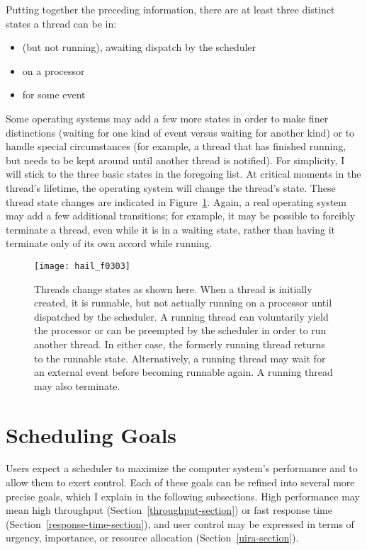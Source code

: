 Putting together the preceding information, there are at least
three distinct states a thread can be in:
\begin{itemize}
\item {} (but not running), awaiting dispatch by the scheduler
\item {} on a processor
\item {} for some event
\end{itemize}
Some operating systems may add a few more states in order to make
finer distinctions (waiting for one kind of event versus waiting for
another kind) or to handle special circumstances (for example, a thread that
has finished running, but needs to be kept around until another thread
is notified).  For simplicity, I will stick to the three basic states
in the foregoing list.  At critical moments in the thread's lifetime, the
operating system will change the thread's state.  These thread state
changes are indicated in Figure~\ref{state-diagram}. Again, a real
operating system may add a few additional transitions; for example, it
may be possible to forcibly terminate a thread, even while it is in a
waiting state, rather than having it terminate only of its own accord
while running.
\begin{figure}
\centerline{\texttt{[image: hail\_f0303]}}
\caption{Threads change states as shown here. When a thread is initially created, it is runnable, but not
  actually running on a processor until dispatched by the scheduler.
  A running thread can voluntarily yield the processor or can be preempted
  by the scheduler in order to run another thread.  In either case,
  the formerly running thread returns to the runnable state.
  Alternatively, a running thread may wait for an external event before becoming runnable again. A running thread may also terminate.}
\label{state-diagram}
\end{figure}

\section{Scheduling Goals}\label{scheduling-goals-section}

Users expect a scheduler to maximize the computer system's
performance and to allow them to exert control.  Each of these goals
can be refined into several more precise goals, which I explain in the
following subsections.  High performance may mean high throughput
(Section~\ref{throughput-section}) or fast response time
(Section~\ref{response-time-section}), and user control may be
expressed in terms of urgency, importance, or resource allocation
(Section~\ref{uira-section}).

